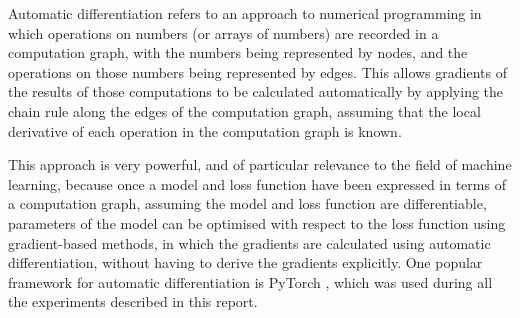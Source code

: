 Automatic differentiation refers to an approach to numerical programming in which operations on numbers (or arrays of numbers) are recorded in a computation graph, with the numbers being represented by nodes, and the operations on those numbers being represented by edges. This allows gradients of the results of those computations to be calculated automatically by applying the chain rule along the edges of the computation graph, assuming that the local derivative of each operation in the computation graph is known.

This approach is very powerful, and of particular relevance to the field of machine learning, because once a model and loss function have been expressed in terms of a computation graph, assuming the model and loss function are differentiable, parameters of the model can be optimised with respect to the loss function using gradient-based methods, in which the gradients are calculated using automatic differentiation, without having to derive the gradients explicitly. One popular framework for automatic differentiation is PyTorch \cite{paszke2019pytorch}, which was used during all the experiments described in this report.
